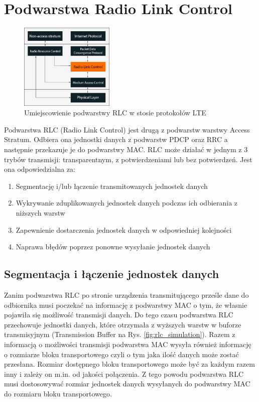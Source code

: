 \chapter{Podwarstwa Radio Link Control}
\label{cha:rlc}

\begin{figure}
	\centerline{\includegraphics[width=0.4\textwidth]{images/rlc_overview.png}}
	\caption{Umiejscowienie podwarstwy RLC w stosie protokołów LTE}
	\label{fig:rlc_overview}
\end{figure}

Podwarstwa RLC (Radio Link Control) jest drugą z podwarstw warstwy Access Stratum. Odbiera ona jednostki danych z podwarstw PDCP oraz RRC a następnie przekazuje je do podwarstwy MAC. RLC może działać w jednym z 3 trybów transmisji: transparentnym, z potwierdzeniami lub bez potwierdzeń. Jest ona odpowiedzialna za:

\begin{enumerate}
	\item Segmentację i/lub łączenie transmitowanych jednostek danych
	\item Wykrywanie zduplikowanych jednostek danych podczas ich odbierania z niższych warstw
	\item Zapewnienie dostarczenia jednostek danych w odpowiedniej kolejności
	\item Naprawa błędów poprzez ponowne wysyłanie jednostek danych
\end{enumerate}

\section{Segmentacja i łączenie jednostek danych}

Zanim podwarstwa RLC po stronie urządzenia transmitującego prześle dane do odbiornika musi poczekać na informację z podwarstwy MAC o tym, że własnie pojawiła się możliwość transmisji danych. Do tego czasu podwarstwa RLC przechowuje jednostki danych, które otrzymała z wyższych warstw w buforze transmisyjnym (Transmission Buffer na Rys. \ref{fig:rlc_simulation}). Razem z informacją o możliwości transmisji podwarstwa MAC wysyła również informację o rozmiarze bloku transportowego czyli o tym jaka ilość danych może zostać przesłana. Rozmiar dostępnego bloku transportowego może być za każdym razem inny i zależy on m.in. od jakości połączenia. Z tego powodu podwarstwa RLC musi dostosowywać rozmiar jednostek danych wysyłanych do podwarstwy MAC do rozmiaru bloku transportowego.

